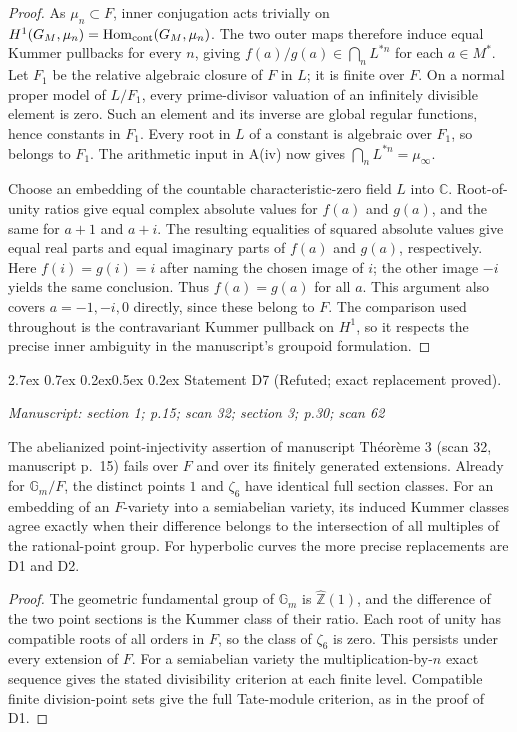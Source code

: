 \documentclass[11pt,a4paper]{article}
\makeatletter
\newcommand{\passage}[1]{\par\smallskip\noindent\textit{Manuscript: #1}\par\smallskip}
\renewcommand\paragraph{\@startsection{paragraph}{4}{\z@}%
  {2.7ex \@plus 0.7ex \@minus 0.2ex}{0.5ex \@plus 0.2ex}%
  {\normalfont\normalsize\bfseries}}
\makeatother
\begin{document}
\begin{proof}
As $\mu_n\subset F$, inner conjugation acts trivially on
$H^1(G_M,\mu_n)=\operatorname{Hom}_{\rm cont}(G_M,\mu_n)$.
The two outer maps therefore induce equal Kummer pullbacks for every
$n$, giving $f(a)/g(a)\in\bigcap_n L^{*n}$ for each $a\in M^*$.
Let $F_1$ be the relative algebraic closure of $F$ in $L$; it is finite
over $F$.  On a normal proper model of $L/F_1$, every prime-divisor
valuation of an infinitely divisible element is zero.  Such an element
and its inverse are global regular functions, hence constants in $F_1$.
Every root in $L$ of a constant is algebraic over $F_1$, so belongs to
$F_1$.  The arithmetic input in A(iv) now gives
$\bigcap_nL^{*n}=\mu_\infty$.

Choose an embedding of the countable characteristic-zero field $L$ into
$\mathbb C$.  Root-of-unity ratios give equal complex absolute values
for $f(a)$ and $g(a)$, and the same for $a+1$ and $a+i$.
The resulting equalities of squared absolute values give equal real
parts and equal imaginary parts of $f(a)$ and $g(a)$, respectively.
Here $f(i)=g(i)=i$ after naming the chosen image of $i$; the other image
$-i$ yields the same conclusion.  Thus $f(a)=g(a)$ for all $a$.
This argument also covers $a=-1,-i,0$ directly, since these belong to
$F$.  The comparison used throughout is the contravariant Kummer
pullback on $H^1$, so it respects the precise inner ambiguity in the
manuscript's groupoid formulation.
\end{proof}

\paragraph{Statement D7 (Refuted; exact replacement proved).}\label{res:D7}
\passage{section 1; p.15; scan 32; section 3; p.30; scan 62}

The abelianized point-injectivity assertion of manuscript Th\'eor\`eme 3
(scan 32, manuscript p.~15) fails over $F$ and over its finitely generated
extensions.  Already for $\mathbb G_m/F$, the distinct points $1$ and
$\zeta_6$ have identical full section classes.  For an embedding of an
$F$-variety into a semiabelian variety, its induced Kummer classes agree
exactly when their difference belongs to the intersection of all
multiples of the rational-point group.  For hyperbolic curves the more
precise replacements are D1 and D2.

\begin{proof}
The geometric fundamental group of $\mathbb G_m$ is
$\widehat{\mathbb Z}(1)$, and the difference of the two point sections
is the Kummer class of their ratio.  Each root of unity has compatible
roots of all orders in $F$, so the class of $\zeta_6$ is zero.  This
persists under every extension of $F$.  For a semiabelian variety the
multiplication-by-$n$ exact sequence gives the stated divisibility
criterion at each finite level.  Compatible finite division-point sets
give the full Tate-module criterion, as in the proof of D1.
\end{proof}
\end{document}
